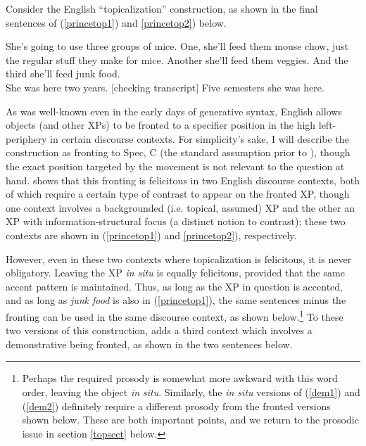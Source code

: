 Consider the English ``topicalization'' construction, as shown in the final sentences of (\ref{princetop1}) and \ref{princetop2}) below.

\begin{exe}
\ex \label{princetop1} She's going to use three groups of mice.
One, she'll feed them mouse chow, just the regular stuff they make for
mice.
Another she'll feed them veggies.
And the third she'll feed junk food.\\

\ex \label{princetop2} She was here two years.
[checking transcript] Five semesters she was here.\\
\citep[][8,9]{prince1999} 

\end{exe}

\noindent As was well-known even in the early days of generative syntax, English allows objects (and other XPs) to be fronted to a specifier position in the high left-periphery in certain discourse contexts.
For simplicity's sake, I will describe the construction as fronting to Spec, C (the standard assumption prior to \citealt{rizzi1997}), though the exact position targeted by the movement is not relevant to the question at hand.
\citet{prince1985,prince1998, prince1999} shows that this fronting is felicitous in two English discourse contexts, both of which require a certain type of contrast to appear on the fronted XP, though one context involves a backgrounded (i.e. topical, assumed) XP and the other an XP with information-structural focus (a distinct notion to contrast); these two contexts are shown in (\ref{princetop1}) and \ref{princetop2}), respectively.

However, even in these two contexts where topicalization is felicitous, it is never obligatory.
Leaving the XP \textsl{in situ} is equally felicitous, provided that the same accent pattern is maintained.
Thus, as long as the XP in question is accented, and as long as \textsl{junk food} is also in (\ref{princetop1}), the same sentences minus the fronting can be used in the same discourse context, as shown below.\footnote{Perhaps the required prosody is somewhat more awkward with this word order, leaving the object \textsl{in situ}.
Similarly, the \textsl{in situ} versions of (\ref{dem1}) and (\ref{dem2}) definitely require a different prosody from the fronted versions shown below.
These are both important points, and we return to the prosodic issue in section \ref{topsect} below.} To these two versions of this construction, \citet{caitldiss} adds a third context which involves a demonstrative being fronted, as shown in the two sentences below.


